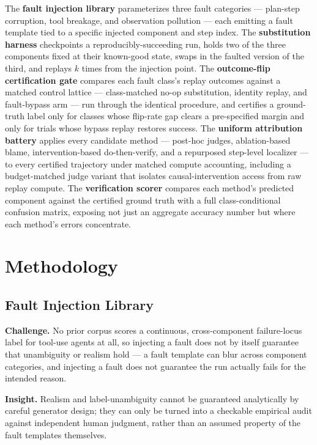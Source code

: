 \documentclass[11pt]{article}
\begin{document}
The \textbf{fault injection library} parameterizes three fault categories --- plan-step corruption, tool breakage, and observation pollution --- each emitting a fault template tied to a specific injected component and step index. The \textbf{substitution harness} checkpoints a reproducibly-succeeding run, holds two of the three components fixed at their known-good state, swaps in the faulted version of the third, and replays $k$ times from the injection point. The \textbf{outcome-flip certification gate} compares each fault class's replay outcomes against a matched control lattice --- class-matched no-op substitution, identity replay, and fault-bypass arm --- run through the identical procedure, and certifies a ground-truth label only for classes whose flip-rate gap clears a pre-specified margin and only for trials whose bypass replay restores success. The \textbf{uniform attribution battery} applies every candidate method --- post-hoc judges, ablation-based blame, intervention-based do-then-verify, and a repurposed step-level localizer --- to every certified trajectory under matched compute accounting, including a budget-matched judge variant that isolates causal-intervention access from raw replay compute. The \textbf{verification scorer} compares each method's predicted component against the certified ground truth with a full class-conditional confusion matrix, exposing not just an aggregate accuracy number but where each method's errors concentrate.

\section{Methodology}

\subsection{Fault Injection Library}
\textbf{Challenge.} No prior corpus scores a continuous, cross-component failure-locus label for tool-use agents at all, so injecting a fault does not by itself guarantee that unambiguity or realism hold --- a fault template can blur across component categories, and injecting a fault does not guarantee the run actually fails for the intended reason.

\textbf{Insight.} Realism and label-unambiguity cannot be guaranteed analytically by careful generator design; they can only be turned into a checkable empirical audit against independent human judgment, rather than an assumed property of the fault templates themselves.
\end{document}
